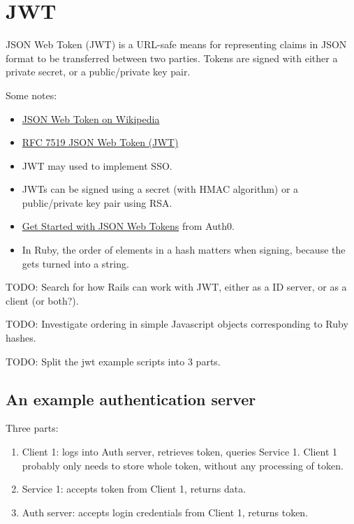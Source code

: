 \section{JWT}

JSON Web Token (JWT) is a URL-safe means for representing
claims in JSON format to be transferred between two parties.
Tokens are signed with either a private secret, or a public/private
key pair.


Some notes:

\begin{itemize}
  \item \href{https://en.wikipedia.org/wiki/JSON_Web_Token}{%
     JSON Web Token on Wikipedia}
  \item \href{https://tools.ietf.org/html/rfc7519}{%
     RFC 7519 JSON Web Token (JWT)}
 \item JWT may used to implement SSO.
 \item JWTs can be signed using a secret (with HMAC algorithm) or a
   public/private key pair using RSA.
 \item \href{https://auth0.com/learn/json-web-tokens/}{%
Get Started with JSON Web Tokens} from Auth0.
  \item In Ruby, the order of elements in a hash matters when signing, because the
        gets turned into a string.
\end{itemize}

TODO: Search for how Rails can work with JWT, either as a ID server,
or as a client (or both?).

TODO: Investigate ordering in simple Javascript objects corresponding to Ruby hashes.

TODO: Split the jwt example scripts into 3 parts.

\subsection{An example authentication server}

Three parts:

\begin{enumerate}
  \item Client 1: logs into Auth server, retrieves token, queries Service 1.
        Client 1 probably only needs to store whole token, without any processing of token.
  \item Service 1: accepts token from Client 1, returns data.
  \item Auth server: accepts login credentials from Client 1, returns token.
\end{enumerate}

